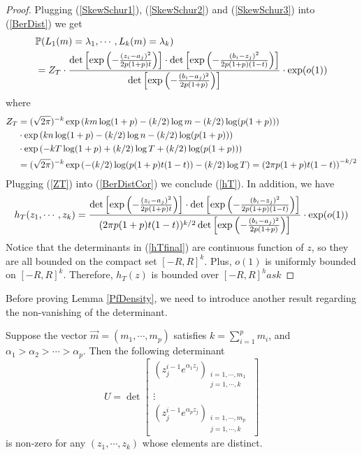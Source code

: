 \begin{proof}
	Plugging (\ref{SkewSchur1}), (\ref{SkewSchur2}) and (\ref{SkewSchur3}) into (\ref{BerDist}) we get
	\begin{equation}{\label{BerDistCor}}
		\begin{split}
			& \mathbb{P}(L_{1}(m)=\lambda_1,\cdots,L_k(m)=\lambda_k)\\
			& =Z_{T}\cdot \frac{\det\left[\exp\left(-\frac{(z_{i}-a_j)^2}{2p(1+p)t}\right)\right]\cdot\det\left[\exp\left(-\frac{(b_{i}-z_j)^2}{2p(1+p)(1-t)}\right)\right]}{\det\left[\exp\left(-\frac{(b_{i}-a_j)^2}{2p(1+p)}\right)\right]}\cdot \exp(o(1))
		\end{split}
	\end{equation}
	where 
	\begin{equation}{\label{ZT}}
		\begin{split}
			Z_{T}&=(\sqrt{2\pi})^{-k}\exp\left(km\log(1+p)-(k/2)\log m-(k/2)\log(p(1+p))\right)\\
			&\cdot \exp\left(kn\log(1+p)-(k/2)\log n-(k/2)\log(p(1+p))\right)\\
			& \cdot \exp\left(-kT\log(1+p)+(k/2)\log T+(k/2)\log(p(1+p))\right)\\
			&=(\sqrt{2\pi})^{-k}\exp\left(-(k/2)\log(p(1+p)t(1-t))-(k/2)\log T\right)=\left(2\pi p(1+p)t(1-t)\right)^{-k/2}
		\end{split}
	\end{equation}
	Plugging (\ref{ZT}) into (\ref{BerDistCor}) we conclude (\ref{hT}). In addition, we have
	\begin{equation}{\label{hTfinal}}
		\begin{split}
			h_{T}(z_1,\cdots,z_k)=\frac{\det\left[\exp\left(-\frac{(z_{i}-a_j)^2}{2p(1+p)t}\right)\right]\cdot\det\left[\exp\left(-\frac{(b_{i}-z_j)^2}{2p(1+p)(1-t)}\right)\right]}{(2\pi p(1+p)t(1-t))^{k/2}\det\left[\exp\left(-\frac{(b_{i}-a_j)^2}{2p(1+p)}\right)\right]}\cdot \exp(o(1))
		\end{split}
	\end{equation}
	Notice that the determinants in (\ref{hTfinal}) are continuous function of $z$, so they are all bounded on the compact set $[-R,R]^{k}$. Plus, $o(1)$ is uniformly bounded on $[-R,R]^{k}$. Therefore, $h_{T}(z)$ is bounded over $[-R,R]^has k$
\end{proof}
Before proving Lemma \ref{PfDensity}, we need to introduce another result regarding the non-vanishing of the determinant.

\begin{lemma}{\label{NonVanish}}
	Suppose the vector $\vec{m}=(m_1,\cdots,m_p)$ satisfies $k=\sum_{i=1}^{p}m_{i}$, and $\alpha_1>\alpha_2>\cdots>\alpha_p$. Then the following determinant
\[ U= \det
	\left[ \begin{array}{ccc}
		(z_{j}^{i-1}e^{\alpha_{1}z_{j}})_{\substack{i=1,\cdots,m_{1}\\j=1,\cdots,k}}\\
	\vdots\\
	(z_{j}^{i-1}e^{\alpha_{p}z_{j}})_{\substack{i=1,\cdots,m_{p}\\j=1,\cdots,k}}
	\end{array}
	\right]
\]
is non-zero for any $(z_{1},\cdots,z_{k})$ whose elements are distinct.
\end{lemma}


